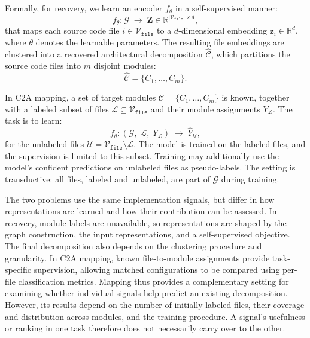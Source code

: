 Formally, for recovery, we learn an encoder $f_{\theta}$ in a self-supervised manner:
\begin{equation}
f_{\theta}: \mathcal{G}\;\longrightarrow\;\mathbf{Z}\in\mathbb{R}^{|\mathcal{V}_{\texttt{file}}|\times d},
\label{eq:sar}
\end{equation}
that maps each source code file $i \in \mathcal{V}_{\texttt{file}}$ to a $d$-dimensional embedding $\mathbf{z}_i \in \mathbb{R}^{d}$, where $\theta$ denotes the learnable parameters. The resulting file embeddings are clustered into a recovered architectural decomposition $\hat{\mathcal{C}}$, which partitions the source code files into $m$ disjoint modules:
\begin{equation}
\hat{\mathcal{C}} = \{C_1, \dots, C_m\}.
\label{eq:sar-partition}
\end{equation}

In C2A mapping, a set of target modules $\mathcal{C} = \{C_1, \dots, C_m\}$ is known, together with a labeled subset of files $\mathcal{L} \subseteq \mathcal{V}_{\texttt{file}}$ and their module assignments $Y_{\mathcal{L}}$. The task is to learn:
%
\begin{equation}
f_{\theta}: (\mathcal{G},\;\mathcal{L},\;Y_{\mathcal{L}})\;\longrightarrow\;\hat{Y}_{\mathcal{U}},
\label{eq:c2a}
\end{equation}
for the unlabeled files $\mathcal{U} = \mathcal{V}_{\texttt{file}} \setminus \mathcal{L}$. The model is trained on the labeled files, and the supervision is limited to this subset. Training may additionally use the model's confident predictions on unlabeled files as pseudo-labels. The setting is transductive: all files, labeled and unlabeled, are part of $\mathcal{G}$ during training.

The two problems use the same implementation signals, but differ in how representations are learned and how their contribution can be assessed. In recovery, module labels are unavailable, so representations are shaped by the graph construction, the input representations, and a self-supervised objective. The final decomposition also depends on the clustering procedure and granularity. In C2A mapping, known file-to-module assignments provide task-specific supervision, allowing matched configurations to be compared using per-file classification metrics. Mapping thus provides a complementary setting for examining whether individual signals help predict an existing decomposition. However, its results depend on the number of initially labeled files, their coverage and distribution across modules, and the training procedure. A signal's usefulness or ranking in one task therefore does not necessarily carry over to the other.

